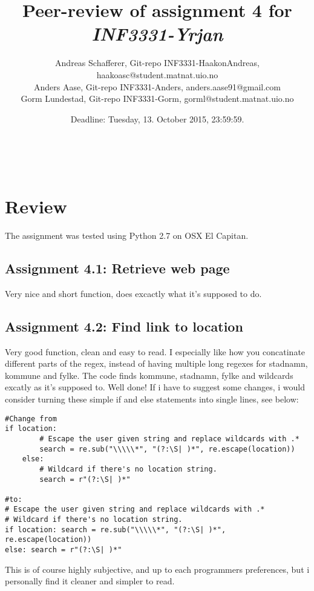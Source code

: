 \documentclass[a4paper]{article}
\title{Peer-review of assignment 4 for \textit{INF3331-Yrjan}}
\author{Andreas Schafferer, Git-repo INF3331-HaakonAndreas, {haakoasc@student.matnat.uio.no} \\
 		Anders Aase, Git-repo INF3331-Anders, {anders.aase91@gmail.com} \\
		Gorm Lundestad, Git-repo INF3331-Gorm, {gorml@student.matnat.uio.no }}
\date{Deadline: Tuesday, 13. October 2015, 23:59:59.}
\begin{document}
\maketitle



\

\section{Review}\label{sec:review}

The assignment was tested using Python 2.7 on OSX El Capitan.

\subsection*{Assignment 4.1: Retrieve web page}
Very nice and short function, does excactly what it's supposed to do.


\subsection*{Assignment 4.2: Find link to location}
Very good function, clean and easy to read. I especially like how you concatinate different parts of the regex, instead of having multiple long regexes for stadnamn, kommune and fylke. \newline\newline
The code finds kommune, stadnamn, fylke and wildcards excatly as it's supposed to. Well done!\newline\newline
If i have to suggest some changes, i would consider turning these simple if and else statements into single lines, see below:

\begin{verbatim}
#Change from
if location:
        # Escape the user given string and replace wildcards with .*
        search = re.sub("\\\\\*", "(?:\S| )*", re.escape(location))
    else:
        # Wildcard if there's no location string.
        search = r"(?:\S| )*"

#to:
# Escape the user given string and replace wildcards with .*
# Wildcard if there's no location string.
if location: search = re.sub("\\\\\*", "(?:\S| )*", re.escape(location))
else: search = r"(?:\S| )*" 
\end{verbatim}
\newline
This is of course highly subjective, and up to each programmers preferences, but i personally find it cleaner and simpler to read.
\end{document}
